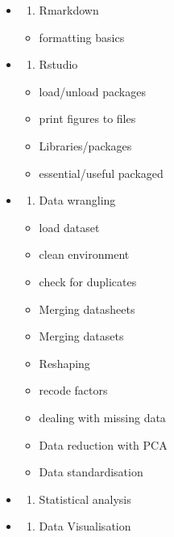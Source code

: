 \documentclass[
]{article}
\providecommand{\tightlist}{%
  \setlength{\itemsep}{0pt}\setlength{\parskip}{0pt}}
\begin{document}
\begin{itemize}
\item
  \begin{enumerate}
  \def\labelenumi{\arabic{enumi}.}
  \tightlist
  \item
    Rmarkdown
  \end{enumerate}

  \begin{itemize}
  \tightlist
  \item
    formatting basics
  \end{itemize}
\item
  \begin{enumerate}
  \def\labelenumi{\arabic{enumi}.}
  \setcounter{enumi}{1}
  \tightlist
  \item
    Rstudio
  \end{enumerate}

  \begin{itemize}
  \tightlist
  \item
    load/unload packages
  \item
    print figures to files
  \item
    Libraries/packages
  \item
    essential/useful packaged
  \end{itemize}
\item
  \begin{enumerate}
  \def\labelenumi{\arabic{enumi}.}
  \setcounter{enumi}{2}
  \tightlist
  \item
    Data wrangling
  \end{enumerate}

  \begin{itemize}
  \tightlist
  \item
    load dataset
  \item
    clean environment
  \item
    check for duplicates
  \item
    Merging datasheets
  \item
    Merging datasets
  \item
    Reshaping
  \item
    recode factors
  \item
    dealing with missing data
  \item
    Data reduction with PCA
  \item
    Data standardisation
  \end{itemize}
\item
  \begin{enumerate}
  \def\labelenumi{\arabic{enumi}.}
  \setcounter{enumi}{3}
  \tightlist
  \item
    Statistical analysis
  \end{enumerate}
\item
  \begin{enumerate}
  \def\labelenumi{\arabic{enumi}.}
  \setcounter{enumi}{4}
  \tightlist
  \item
    Data Visualisation
  \end{enumerate}


\end{itemize}
\end{document}
